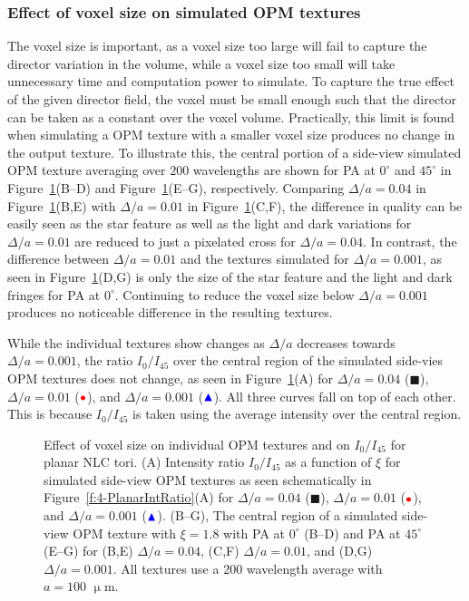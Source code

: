 \subsubsection{Effect of voxel size on simulated OPM textures}
The voxel size is important, as a voxel size too large will fail to capture the director variation in the volume, while a voxel size too small will take unnecessary time and computation power to simulate.
To capture the true effect of the given director field, the voxel must be small enough such that the director can be taken as a constant over the voxel volume.
Practically, this limit is found when simulating a OPM texture with a smaller voxel size produces no change in the output texture.
To illustrate this, the central portion of a side-view simulated OPM texture averaging over $200$ wavelengths are shown for PA at $0^{\circ}$ and $45^{\circ}$ in Figure~\ref{f:4-PlanarVoxel}(B--D) and Figure~\ref{f:4-PlanarVoxel}(E--G), respectively.
Comparing $\Delta /a = 0.04$ in Figure~\ref{f:4-PlanarVoxel}(B,E) with $\Delta /a = 0.01$ in Figure~\ref{f:4-PlanarVoxel}(C,F), the difference in quality can be easily seen as the star feature as well as the light and dark variations for $\Delta /a = 0.01$ are reduced to just a pixelated cross for $\Delta /a = 0.04$.
In contrast, the difference between $\Delta /a = 0.01$ and the textures simulated for $\Delta /a = 0.001$, as seen in Figure~\ref{f:4-PlanarVoxel}(D,G) is only the size of the star feature and the light and dark fringes for PA at $0^{\circ}$.
Continuing to reduce the voxel size below $\Delta /a = 0.001$ produces no noticeable difference in the resulting textures.

While the individual textures show changes as $\Delta /a$ decreases towards $\Delta /a = 0.001$, the ratio $I_0/I_{45}$ over the central region of the simulated side-vies OPM textures does not change, as seen in Figure~\ref{f:4-PlanarVoxel}(A) for $\Delta /a = 0.04$ ($\blacksquare$), $\Delta /a = 0.01$ (${\color{red}\bullet}$), and $\Delta /a = 0.001$ (${\color{blue}\blacktriangle}$).
All three curves fall on top of each other.
This is because $I_0/I_{45}$ is taken using the average intensity over the central region.
\begin{figure}
\centering
\caption{Effect of voxel size on individual OPM textures and on $I_0/I_{45}$ for planar NLC tori.
(A) Intensity ratio $I_0/I_{45}$ as a function of $\xi$ for simulated side-view OPM textures as seen schematically in Figure~\ref{f:4-PlanarIntRatio}(A) for $\Delta /a = 0.04$ ($\blacksquare$), $\Delta /a = 0.01$ (${\color{red}\bullet}$), and $\Delta /a = 0.001$ (${\color{blue}\blacktriangle}$).
(B--G), The central region of a simulated side-view OPM texture with $\xi = 1.8$ with PA at $0^{\circ}$ (B--D) and PA at $45^{\circ}$ (E--G) for (B,E) $\Delta /a = 0.04$, (C,F) $\Delta /a = 0.01$, and (D,G) $\Delta /a = 0.001$.
All textures use a $200$ wavelength average with $a = 100$ $\upmu$m.}\label{f:4-PlanarVoxel}
\end{figure}

